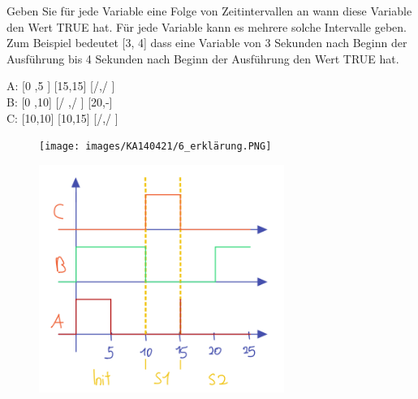 Geben Sie für jede Variable eine Folge von Zeitintervallen an wann diese Variable den Wert TRUE hat. Für
jede Variable kann es mehrere solche Intervalle geben. Zum Beispiel bedeutet [3, 4] dass eine Variable von
3 Sekunden nach Beginn der Ausführung bis 4 Sekunden nach Beginn der Ausführung den Wert TRUE hat.

A: [0 ,5 ] [15,15] [/,/ ]\\
B: [0 ,10] [/ ,/ ] [20,-]\\
C: [10,10] [10,15] [/,/ ]

\begin{figure}[H]
  \texttt{[image: images/KA140421/6\_erklärung.PNG]}
  \centering
\end{figure}

\begin{figure}[H]
  \includegraphics[width=8cm]{images/KA140421/6a_2.PNG}
  \centering
\end{figure}